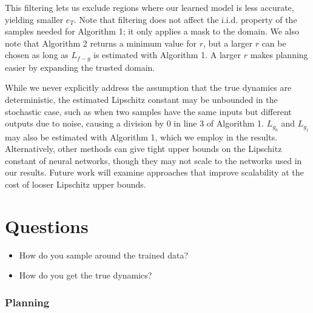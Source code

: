 \documentclass{article}
\begin{document}
This filtering lets us exclude regions where our learned model is less accurate, yielding smaller \( e_T \). Note that filtering does not affect the i.i.d. property of the samples needed for Algorithm 1; it only applies a mask to the domain. We also note that Algorithm 2 returns a minimum value for \( r \), but a larger \( r \) can be chosen as long as \( L_{f-g} \) is estimated with Algorithm 1. A larger \( r \) makes planning easier by expanding the trusted domain.

While we never explicitly address the assumption that the true dynamics are deterministic, the estimated Lipschitz constant may be unbounded in the stochastic case, such as when two samples have the same inputs but different outputs due to noise, causing a division by 0 in line 3 of Algorithm 1. \( L_{g_0} \) and \( L_{g_1} \) may also be estimated with Algorithm 1, which we employ in the results. Alternatively, other methods can give tight upper bounds on the Lipschitz constant of neural networks, though they may not scale to the networks used in our results. Future work will examine approaches that improve scalability at the cost of looser Lipschitz upper bounds.
\section{Questions}
\begin{itemize}
    \item How do you sample around the trained data?
    \item How do you get the true dynamics?
\end{itemize}

\subsubsection{Planning}
\end{document}
